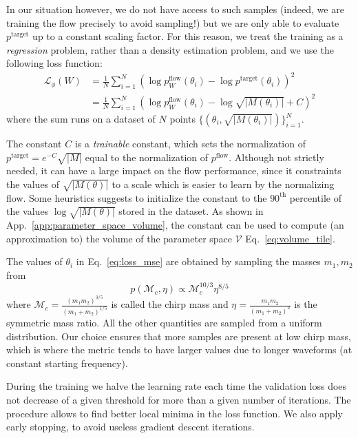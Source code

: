 \documentclass[twocolumn,showpacs,preprintnumbers,nofootinbib,prd,
superscriptaddress,10pt]{revtex4-2}
\begin{document}
In our situation however, we do not have access to such samples (indeed, we are training the flow precisely to avoid sampling!) but we are only able to evaluate $p^\text{target}$ up to a constant scaling factor.
For this reason, we treat the training as a {\it regression} problem, rather than a density estimation problem, and we use the following loss function:
%
\begin{align}\label{eq:loss_mse}
	\mathcal{L}_\phi(W) &= \frac{1}{N} \sum_{i=1}^N \left(\log p^\text{flow}_W(\theta_i) - \log p^\text{target}(\theta_i) \right)^2 \nonumber\\
						&= \frac{1}{N} \sum_{i=1}^N \left(\log p^\text{flow}_W(\theta_i) - \log\sqrt{|M(\theta_i)|} + C \right)^2
\end{align}
%
where the sum runs on a dataset of $N$ points $\{(\theta_i, \sqrt{|M(\theta_i)|})\}_{i=1}^N$.

The constant $C$ is a {\it trainable} constant, which sets the normalization of $p^\text{target} = e^{-C} \sqrt{|M|}$ equal to the normalization of $p^\text{flow}$.
Although not strictly needed, it can have a large impact on the flow performance, since it constraints the values of $\sqrt{|M(\theta)|}$ to a scale which is easier to learn by the normalizing flow.
Some heuristics suggests to initialize the constant to the $90^\text{th}$ percentile of the values $\log \sqrt{|M(\theta)|}$ stored in the dataset.
As shown in App.~\ref{app:parameter_space_volume}, the constant can be used to compute (an approximation to) the volume of the parameter space $\mathcal{V}$ Eq.~\eqref{eq:volume_tile}.

The values of $\theta_i$ in Eq.~\eqref{eq:loss_mse} are obtained by sampling the masses $m_1, m_2$ from
\begin{equation}
	p(\mathcal{M}_c, \eta) \propto \mathcal{M}_c^{10/3} \eta^{8/5}
\end{equation}
where $\mathcal{M}_c = \frac{(m_1m_2)^{3/5}}{(m_1+m_2)^{1/5}}$ is called the chirp mass and $\eta = \frac{m_1m_2}{(m_1+m_2)^2}$ is the symmetric mass ratio.
All the other quantities are sampled from a uniform distribution.
Our choice ensures that more samples are present at low chirp mass, which is where the metric tends to have larger values due to longer waveforms (at constant starting frequency).

During the training we halve the learning rate each time the validation loss does not decrease of a given threshold for more than a given number of iterations. The procedure allows to find better local minima in the loss function. We also apply early stopping, to avoid useless gradient descent iterations.
\end{document}
